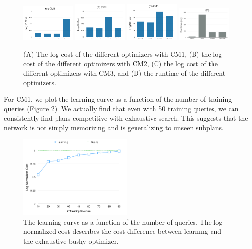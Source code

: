 \begin{figure}[t]
\centering
\includegraphics[width=0.24\textwidth]{sql-experiments/1c.png}
\includegraphics[width=0.24\textwidth]{sql-experiments/1b.png}
\includegraphics[width=0.24\textwidth]{sql-experiments/1a.png}
\includegraphics[width=0.24\textwidth]{sql-experiments/1d.png}
\caption{(A) The log cost of the different optimizers with CM1, (B) the log cost of the different optimizers with CM2,  (C) the log cost of the different optimizers with CM3, and (D) the runtime of the different optimizers. \label{sqla}}
\end{figure}


For CM1, we plot the learning curve as a function of the number of training queries (Figure \ref{lcsql}). We actually find that even with 50 training queries, we can consistently find plans competitive with exhaustive search. This suggests that the network is not simply memorizing and is generalizing to unseen subplans.

\begin{figure}[t]
\centering
\includegraphics[width=0.5\textwidth]{sql-experiments/2a.png}
\caption{The learning curve as a function of the number of queries. The log normalized cost describes the cost difference between learning and the exhaustive bushy optimizer.  \label{lcsql}}
\end{figure}

